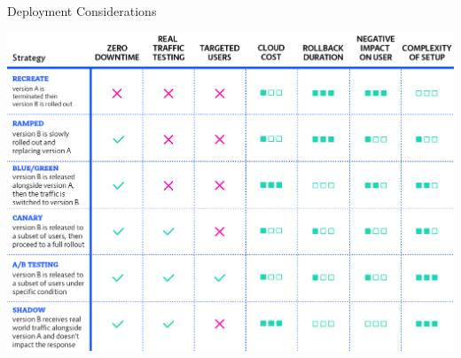 \documentclass{slide}
\begin{document}
\begin{frame}{Deployment Considerations \cite{deployment-strategies}}
    \begin{adjustwidth}{-12mm}{-12mm}
        \centering
        \includegraphics[height=0.96\textheight]{diagrams/deployment_strategies.png}
    \end{adjustwidth}
\end{frame}
\end{document}

